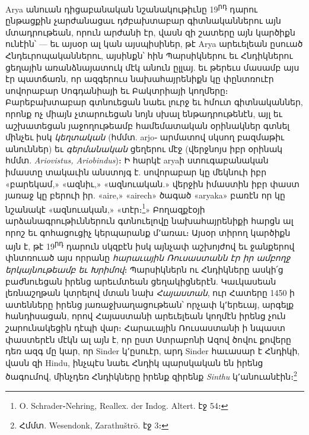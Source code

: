 \documentclass{article}
\begin{document}
{Arya անուան դիցաբանական նշանակութիւնը 19\textsuperscript{րդ} դարու ընթացքին չարժանացաւ դժբախտաբար գիտնականներու այն մտադրութեան, որուն արժանի էր, վասն զի շատերը այն կարծիքն ունէին՝ — եւ այսօր ալ կան այսպիսիներ, թէ Arya արեւելեան ըսուած Հնդեւրոպականներու, այսինքն՝ հին Պարսիկներու եւ Հնդիկներու ցեղային առանձնայատուկ մէկ անուն ըլլայ. եւ թերեւս մասամբ այս էր պատճառն, որ ազգերուս նախահայրենիքն կը փընտռուէր սովորաբար Սոգդանիայի եւ Բակտրիայի կողմերը։ Բարեբախտաբար գտնուեցան նաեւ լուրջ եւ հմուտ գիտնականներ, որոնք ոչ միայն չտարուեցան նոյն սխալ ենթադրութենէն, այլ եւ աշխատեցան յաջողութեամբ համեմատական օրինակներ գտնել մինչեւ իսկ \emph{կեղտական} (հմմտ. arjo֊ արմատով սկսող բազմաթիւ անուններ) եւ \emph{գերմանական} ցեղերու մէջ (վերջնոյս իբր օրինակ հմմտ. \emph{Ariovistus, Ariobindus})։ Ի հարկէ aryaի ստուգաբանական իմաստը տակաւին անստոյգ է. սովորաբար կը մեկնուի իբր «բարեկամ,» «ազնիւ,» «ազնուական.» վերջին իմաստին իբր փաստ յառաջ կը բերուի իր. «aire,» «airech» ծագած «aryaka» բառէն որ կը նշանակէ «ազնուական,» «տէր։\footnote{O. Schrader֊Nehring, Reallex. der Indog. Altert. էջ 54։}» Բողազքէօյի արձանագրութիւններուն գտնուելովը նախահայրենիքի հարցն ալ որոշ եւ գոհացուցիչ կերպարանք մ՚առաւ։ Այսօր տիրող կարծիքն այն է, թէ 19\textsuperscript{րդ} դարուն սկզբէն իսկ այնչափ աշխոյժով եւ ջանքերով փնտռուած այս որրանը \emph{հարաւային Ռուսաստանն էր իր ամբողջ երկայնութեամբ եւ Խրիմով}։ Պարսիկներն ու Հնդիկները ասկի՛ց բաժնուեցան իրենց արեւմտեան ցեղակիցներէն. Կաւկասեան լեռնաշղթան կտրելով մտան նախ \emph{Հայաստան}, ուր Հատերը 1450 ի ատենները իրենց յառաջխաղացութեան՝ որչափ կ՚երեւայ, արգելք հանդիսացան, որով Հայաստանի արեւելեան կողմէն իրենց չուն շարունակեցին դէպի վար։ Հարաւային Ռուսաստանի ի նպաստ փաստերէն մէկն ալ այն է, որ ըստ Ստրաբոնի Ազով ծովու քովերը դեռ ազգ մը կար, որ Sinder կ՚ըսուէր, արդ Sinder հաւասար է Հնդիկի, վասն զի Hindu, ինչպէս նաեւ Հնդիկ պարսկական են իրենց ծագումով, մինչդեռ Հնդիկները իրենք զիրենք \emph{Sinthu} կ՚անուանէին։\footnote{Հմմտ. Wesendonk, Zarathuštrō. էջ 3։}

}
\end{document}
